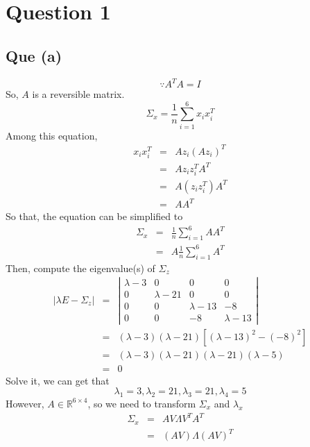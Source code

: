 \documentclass[12pt,letterpaper]{article}
\begin{document}
\section*{Question 1}

\subsection*{Que (a)}
\begin{equation}
	\because A^TA=I
\end{equation}
So, $A$ is a reversible matrix.
\begin{equation}
	\Sigma_x=\frac1n\sum^6_{i=1}x_ix_i^T
\end{equation}
Among this equation,
\begin{eqnarray}
	x_ix_i^T
	&=& Az_i(Az_i)^T\\
	&=& Az_iz_i^TA^T\nonumber\\
	&=& A(z_iz_i^T)A^T\nonumber\\
	&=& AA^T\nonumber
\end{eqnarray}
So that, the equation can be simplified to
\begin{eqnarray}
	\Sigma_x
	&=& \frac1n\sum^6_{i=1}AA^T\\
	&=& A\frac1n\sum^6_{i=1}A^T\nonumber
\end{eqnarray}
Then, compute the eigenvalue(s) of $\Sigma_z$
\begin{eqnarray}
	|\lambda E-\Sigma_z|
	&=& \left|\begin{array}{cccc}
		\lambda-3 & 0 & 0 & 0 \\
		0 & \lambda-21 & 0 & 0 \\
		0 & 0 & \lambda-13 & -8 \\
		0 & 0 & -8 & \lambda-13
	\end{array}\right|\\
	&=& (\lambda-3)(\lambda-21)[(\lambda-13)^2-(-8)^2]\nonumber\\
	&=& (\lambda-3)(\lambda-21)(\lambda-21)(\lambda-5)\nonumber\\
	&=&0\nonumber
\end{eqnarray}
Solve it, we can get that
\begin{equation}
	\lambda_1=3,
	\lambda_2=21,
	\lambda_3=21,
	\lambda_4=5
\end{equation}
However, $A\in\mathbb{R}^{6\times 4}$, so we need to transform $\Sigma_x$ and $\lambda_x$
\begin{eqnarray}
	\Sigma_x
	&=& AV\Lambda V^TA^T\\
	&=& (AV)\Lambda (AV)^T\nonumber
\end{eqnarray}
\end{document}
